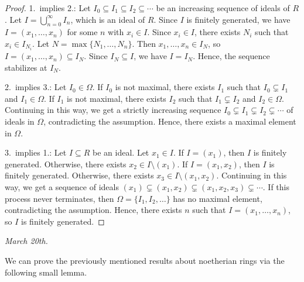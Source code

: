 \begin{proof}
    1.~implies 2.: Let $I_{0} \subseteq I_{1} \subseteq I_{2} \subseteq \cdots$ be an increasing sequence of ideals of $R$. Let $I = \bigcup_{n=0}^{\infty} I_{n}$, which is an ideal of $R$. Since $I$ is finitely generated, we have $I = (x_{1},\ldots,x_{n})$ for some $n$ with $x_{i} \in I$. Since $x_{i} \in I$, there exists $N_{i}$ such that $x_{i} \in I_{N_{i}}$. Let $N = \max\{N_{1},\ldots,N_{n}\}$. Then $x_{1},\ldots,x_{n} \in I_{N}$, so $I = (x_{1},\ldots,x_{n}) \subseteq I_{N}$. Since $I_{N} \subseteq I$, we have $I = I_{N}$. Hence, the sequence stabilizes at $I_{N}$.

    2.~implies 3.: Let $I_{0} \in \Omega$. If $I_{0}$ is not maximal, there exists $I_{1}$ such that $I_{0} \subsetneq I_{1}$ and $I_{1} \in \Omega$. If $I_{1}$ is not maximal, there exists $I_{2}$ such that $I_{1} \subsetneq I_{2}$ and $I_{2} \in \Omega$. Continuing in this way, we get a strictly increasing sequence $I_{0} \subsetneq I_{1} \subsetneq I_{2} \subsetneq \cdots$ of ideals in $\Omega$, contradicting the assumption. Hence, there exists a maximal element in $\Omega$.

    3.~implies 1.: Let $I \subseteq R$ be an ideal. Let $x_{1} \in I$. If $I = (x_{1})$, then $I$ is finitely generated. Otherwise, there exists $x_{2} \in I \setminus (x_{1})$. If $I = (x_{1},x_{2})$, then $I$ is finitely generated. Otherwise, there exists $x_{3} \in I \setminus (x_{1},x_{2})$. Continuing in this way, we get a sequence of ideals $(x_{1}) \subsetneq (x_{1},x_{2}) \subsetneq (x_{1},x_{2},x_{3}) \subsetneq \cdots$. If this process never terminates, then $\Omega = \{I_{1},I_{2},\ldots\}$ has no maximal element, contradicting the assumption. Hence, there exists $n$ such that $I = (x_{1},\ldots,x_{n})$, so $I$ is finitely generated.
\end{proof}

\noindent \textit{March 20th.}

We can prove the previously mentioned results about noetherian rings via the following small lemma.

